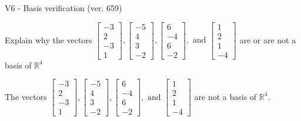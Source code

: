 \begin{exercise}
  \begin{exerciseTitle}V6 - Basis verification (ver. 659)\end{exerciseTitle}
  \begin{exerciseStatement}
    Explain why the vectors \(\left[\begin{array}{r}
-3 \\
2 \\
-3 \\
1
\end{array}\right] , \left[\begin{array}{r}
-5 \\
4 \\
3 \\
-2
\end{array}\right] , \left[\begin{array}{r}
6 \\
-4 \\
6 \\
-2
\end{array}\right] , \text{ and } \left[\begin{array}{r}
1 \\
2 \\
1 \\
-4
\end{array}\right]\) are or are not a basis of \(\mathbb{R}^4\)	


  \end{exerciseStatement}
  \begin{exerciseAnswer}
   The vectors \(\left[\begin{array}{r}
-3 \\
2 \\
-3 \\
1
\end{array}\right] , \left[\begin{array}{r}
-5 \\
4 \\
3 \\
-2
\end{array}\right] , \left[\begin{array}{r}
6 \\
-4 \\
6 \\
-2
\end{array}\right] , \text{ and } \left[\begin{array}{r}
1 \\
2 \\
1 \\
-4
\end{array}\right]\) 
  	 are not  a basis of \(\mathbb{R}^4\).
  


  \end{exerciseAnswer}
\end{exercise}